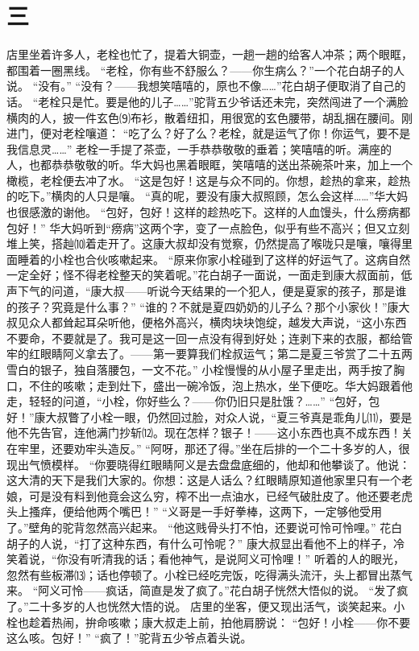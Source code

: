 \documentclass[12pt,UTF8]{ctexbook}
\begin{document}
\chapter{三}
店里坐着许多人，老栓也忙了，提着大铜壶，一趟一趟的给客人冲茶；两个眼眶，都围着一圈黑线。
“老栓，你有些不舒服么？——你生病么？”一个花白胡子的人说。
“没有。”
“没有？——我想笑嘻嘻的，原也不像……”花白胡子便取消了自己的话。
“老栓只是忙。要是他的儿子……”驼背五少爷话还未完，突然闯进了一个满脸横肉的人，披一件玄色⑼布衫，散着纽扣，用很宽的玄色腰带，胡乱捆在腰间。刚进门，便对老栓嚷道：
“吃了么？好了么？老栓，就是运气了你！你运气，要不是我信息灵……”
老栓一手提了茶壶，一手恭恭敬敬的垂着；笑嘻嘻的听。满座的人，也都恭恭敬敬的听。华大妈也黑着眼眶，笑嘻嘻的送出茶碗茶叶来，加上一个橄榄，老栓便去冲了水。
“这是包好！这是与众不同的。你想，趁热的拿来，趁热的吃下。”横肉的人只是嚷。
“真的呢，要没有康大叔照顾，怎么会这样……”华大妈也很感激的谢他。
“包好，包好！这样的趁热吃下。这样的人血馒头，什么痨病都包好！”
华大妈听到“痨病”这两个字，变了一点脸色，似乎有些不高兴；但又立刻堆上笑，搭赸⑽着走开了。这康大叔却没有觉察，仍然提高了喉咙只是嚷，嚷得里面睡着的小栓也合伙咳嗽起来。
“原来你家小栓碰到了这样的好运气了。这病自然一定全好；怪不得老栓整天的笑着呢。”花白胡子一面说，一面走到康大叔面前，低声下气的问道，“康大叔——听说今天结果的一个犯人，便是夏家的孩子，那是谁的孩子？究竟是什么事？”
“谁的？不就是夏四奶奶的儿子么？那个小家伙！”康大叔见众人都耸起耳朵听他，便格外高兴，横肉块块饱绽，越发大声说，“这小东西不要命，不要就是了。我可是这一回一点没有得到好处；连剥下来的衣服，都给管牢的红眼睛阿义拿去了。——第一要算我们栓叔运气；第二是夏三爷赏了二十五两雪白的银子，独自落腰包，一文不花。”
小栓慢慢的从小屋子里走出，两手按了胸口，不住的咳嗽；走到灶下，盛出一碗冷饭，泡上热水，坐下便吃。华大妈跟着他走，轻轻的问道，“小栓，你好些么？——你仍旧只是肚饿？……”
“包好，包好！”康大叔瞥了小栓一眼，仍然回过脸，对众人说，“夏三爷真是乖角儿⑾，要是他不先告官，连他满门抄斩⑿。现在怎样？银子！——这小东西也真不成东西！关在牢里，还要劝牢头造反。”
“阿呀，那还了得。”坐在后排的一个二十多岁的人，很现出气愤模样。
“你要晓得红眼睛阿义是去盘盘底细的，他却和他攀谈了。他说：这大清的天下是我们大家的。你想：这是人话么？红眼睛原知道他家里只有一个老娘，可是没有料到他竟会这么穷，榨不出一点油水，已经气破肚皮了。他还要老虎头上搔痒，便给他两个嘴巴！”
“义哥是一手好拳棒，这两下，一定够他受用了。”壁角的驼背忽然高兴起来。
“他这贱骨头打不怕，还要说可怜可怜哩。”
花白胡子的人说，“打了这种东西，有什么可怜呢？”
康大叔显出看他不上的样子，冷笑着说，“你没有听清我的话；看他神气，是说阿义可怜哩！”
听着的人的眼光，忽然有些板滞⒀；话也停顿了。小栓已经吃完饭，吃得满头流汗，头上都冒出蒸气来。
“阿义可怜——疯话，简直是发了疯了。”花白胡子恍然大悟似的说。
“发了疯了。”二十多岁的人也恍然大悟的说。
店里的坐客，便又现出活气，谈笑起来。小栓也趁着热闹，拚命咳嗽；康大叔走上前，拍他肩膀说：
“包好！小栓——你不要这么咳。包好！”
“疯了！”驼背五少爷点着头说。
\end{document}
